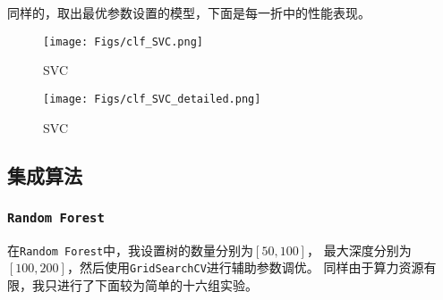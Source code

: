 \documentclass[12pt, a4paper, oneside]{ctexart}
\begin{document}
同样的，取出最优参数设置的模型，下面是每一折中的性能表现。

\begin{figure}[H]
    \centering
    \texttt{[image: Figs/clf\_SVC.png]}
    \caption{SVC}
\end{figure}

\begin{figure}[H]
    \centering
    \texttt{[image: Figs/clf\_SVC\_detailed.png]}
    \caption{SVC}
\end{figure}


\subsection{集成算法}
\subsubsection{\texttt{Random Forest}}
在\texttt{Random Forest}中，我设置树的数量分别为$\left[50, 100\right]$，
最大深度分别为$\left[100, 200\right]$，然后使用\texttt{GridSearchCV}进行辅助参数调优。
同样由于算力资源有限，我只进行了下面较为简单的十六组实验。
\end{document}
